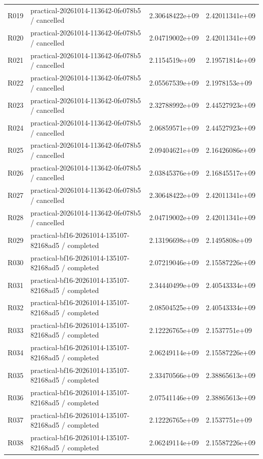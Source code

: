 \documentclass[10pt]{article}
\begin{document}
{\begin{longtable}{p{}p{}p{}p{}}
R019 & practical-20261014-113642-0fe078b5 / cancelled & 2.30648422e+09 & 2.42011341e+09 \\
R020 & practical-20261014-113642-0fe078b5 / cancelled & 2.04719002e+09 & 2.42011341e+09 \\
R021 & practical-20261014-113642-0fe078b5 / cancelled & 2.1154519e+09 & 2.19571814e+09 \\
R022 & practical-20261014-113642-0fe078b5 / cancelled & 2.05567539e+09 & 2.1978153e+09 \\
R023 & practical-20261014-113642-0fe078b5 / cancelled & 2.32788992e+09 & 2.44527923e+09 \\
R024 & practical-20261014-113642-0fe078b5 / cancelled & 2.06859571e+09 & 2.44527923e+09 \\
R025 & practical-20261014-113642-0fe078b5 / cancelled & 2.09404621e+09 & 2.16426086e+09 \\
R026 & practical-20261014-113642-0fe078b5 / cancelled & 2.03845376e+09 & 2.16845517e+09 \\
R027 & practical-20261014-113642-0fe078b5 / cancelled & 2.30648422e+09 & 2.42011341e+09 \\
R028 & practical-20261014-113642-0fe078b5 / cancelled & 2.04719002e+09 & 2.42011341e+09 \\
R029 & practical-bf16-20261014-135107-82168ad5 / completed & 2.13196698e+09 & 2.1495808e+09 \\
R030 & practical-bf16-20261014-135107-82168ad5 / completed & 2.07219046e+09 & 2.15587226e+09 \\
R031 & practical-bf16-20261014-135107-82168ad5 / completed & 2.34440499e+09 & 2.40543334e+09 \\
R032 & practical-bf16-20261014-135107-82168ad5 / completed & 2.08504525e+09 & 2.40543334e+09 \\
R033 & practical-bf16-20261014-135107-82168ad5 / completed & 2.12226765e+09 & 2.1537751e+09 \\
R034 & practical-bf16-20261014-135107-82168ad5 / completed & 2.06249114e+09 & 2.15587226e+09 \\
R035 & practical-bf16-20261014-135107-82168ad5 / completed & 2.33470566e+09 & 2.38865613e+09 \\
R036 & practical-bf16-20261014-135107-82168ad5 / completed & 2.07541146e+09 & 2.38865613e+09 \\
R037 & practical-bf16-20261014-135107-82168ad5 / completed & 2.12226765e+09 & 2.1537751e+09 \\
R038 & practical-bf16-20261014-135107-82168ad5 / completed & 2.06249114e+09 & 2.15587226e+09 \\

\end{longtable}}
\end{document}
